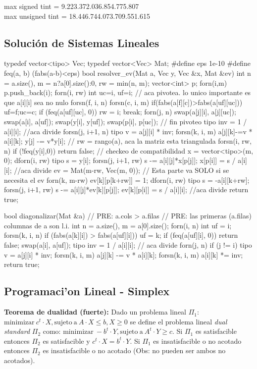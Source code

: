 \documentclass[10pt,landscape,twocolumn,a4paper,notitlepage]{article}
\begin{document}
max signed tint = 9.223.372.036.854.775.807 \\
max unsigned tint = 18.446.744.073.709.551.615
%
%
\subsection{Soluci\'on de Sistemas Lineales}
\begin{code}
typedef vector<tipo> Vec;
typedef vector<Vec> Mat;
#define eps 1e-10
#define feq(a, b) (fabs(a-b)<eps)
bool resolver_ev(Mat a, Vec y, Vec &x, Mat &ev){
  int n = a.size(), m = n?a[0].size():0, rw = min(n, m);
  vector<int> p; forn(i,m) p.push_back(i);
  forn(i, rw){
    int uc=i, uf=i;
    // aca pivotea. lo unico importante es que a[i][i] sea no nulo
    forsn(f, i, n) forsn(c, i, m) if(fabs(a[f][c])>fabs(a[uf][uc])) {uf=f;uc=c;}
    if (feq(a[uf][uc], 0)) { rw = i; break; }
    forn(j, n) swap(a[j][i], a[j][uc]);
    swap(a[i], a[uf]); swap(y[i], y[uf]); swap(p[i], p[uc]);
    // fin pivoteo
    tipo inv = 1 / a[i][i]; //aca divide
    forsn(j, i+1, n) {
      tipo v = a[j][i] * inv;
      forsn(k, i, m) a[j][k]-=v * a[i][k];
      y[j] -= v*y[i];
    }
  } // rw = rango(a), aca la matriz esta triangulada
  forsn(i, rw, n) if (!feq(y[i],0)) return false; // checkeo de compatibilidad
  x = vector<tipo>(m, 0);
  dforn(i, rw){
    tipo s = y[i];
    forsn(j, i+1, rw) s -= a[i][j]*x[p[j]];
    x[p[i]] = s / a[i][i]; //aca divide
  }
  ev = Mat(m-rw, Vec(m, 0)); // Esta parte va SOLO si se necesita el ev
  forn(k, m-rw) {
    ev[k][p[k+rw]] = 1;
    dforn(i, rw){
      tipo s = -a[i][k+rw];
      forsn(j, i+1, rw) s -= a[i][j]*ev[k][p[j]];
      ev[k][p[i]] = s / a[i][i]; //aca divide
    }
  }
  return true;
}

bool diagonalizar(Mat &a){
	// PRE: a.cols > a.filas
	// PRE: las primeras (a.filas) columnas de a son l.i.
  int n = a.size(), m = a[0].size();
  forn(i, n){
		int uf = i;
		forsn(k, i, n) if (fabs(a[k][i]) > fabs(a[uf][i])) uf = k;
		if (feq(a[uf][i], 0)) return false;
		swap(a[i], a[uf]);
    tipo inv = 1 / a[i][i]; // aca divide
    forn(j, n) if (j != i) {
      tipo v = a[j][i] * inv;
      forsn(k, i, m) a[j][k] -= v * a[i][k];
		}
    forsn(k, i, m) a[i][k] *= inv;
  }
	return true;
}
\end{code}
\subsection{Programaci'on Lineal - Simplex}
\textbf{Teorema de dualidad (fuerte):} Dado un problema lineal $\Pi_1$: $\mathrm{minimizar}\ c^t\cdot X, \mathrm{sujeto\ a}\ A\cdot X \leqslant b, X \geqslant 0$ se define el problema lineal \emph{dual standard} $\Pi_2$  como: $\mathrm{minimizar}\ -b^t\cdot Y, \mathrm{sujeto\ a}\ A^t\cdot Y \geqslant c$. Si $\Pi_1$ es satisfacible entonces $\Pi_2$ es satisfacible y $c^t\cdot X = b^t \cdot Y$. Si $\Pi_1$ es insatisfacible o no acotado entonces $\Pi_2$ es insatisfacible o no acotado (Obs: no pueden ser ambos no acotados).
\end{document}
